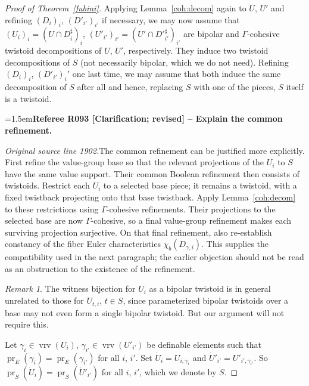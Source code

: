 \documentclass[12pt]{amsart}
\newcommand{\RefereeRemark}[4]{%
  \par\medskip\begingroup\normalfont\small\color{RefereePurple}%
  \emergencystretch=1.5em\noindent\textbf{Referee R#1 [#2] -- #3.}\par\nobreak\noindent #4\par
  \endgroup\medskip
}
\theoremstyle{plain}
\theoremstyle{definition}
\theoremstyle{remark}
\newtheorem{rem}[thm]{Remark}
\numberwithin{equation}{section}
\theoremstyle{plain}
\DeclareMathOperator{\pr}{pr}
\DeclareMathOperator{\K}{\mathds{k}}
\newcommand{\0}{\emptyset}
\DeclareMathOperator{\vrv}{vrv}
\DeclareMathOperator{\tbk}{tbk}
\begin{document}
\begin{proof}[Proof of Theorem~\ref{fubini}]
Applying Lemma~\ref{coh:decom} again to $U$, $U'$ and refining $(D_{i})_i$, $(D'_{i'})_{i'}$ if necessary, we may now assume that $(U_i)_i = (U \cap D^\sharp_i)_i$, $(U'_{i'})_{i'} = (U' \cap {D'}^\sharp_{i'})_{i'}$ are bipolar and $\Gamma$-cohesive twistoid decompositions of $U$, $U'$, respectively. They induce two twistoid decompositions of $S$ (not necessarily bipolar, which we do not need). Refining $(D_{i})_i$, $(D'_{i'})_i'$ one last time, we may assume that both induce the same decomposition of $S$ after all and hence, replacing $S$ with one of the pieces,  $S$ itself is a twistoid.

\RefereeRemark{093}{Clarification; revised}{Explain the common refinement}{%
\textit{Original source line 1902.}\quad The common refinement can be justified more explicitly. First refine the value-group base so that the relevant projections of the $U_i$ to $S$ have the same value support. Their common Boolean refinement then consists of twistoids. Restrict each $U_i$ to a selected base piece; it remains a twistoid, with a fixed twistback projecting onto that base twistback. Apply Lemma~\ref{coh:decom} to these restrictions using $\Gamma$-cohesive refinements. Their projections to the selected base are now $\Gamma$-cohesive, so a final value-group refinement makes each surviving projection surjective. On that final refinement, also re-establish constancy of the fiber Euler characteristics $\chi_b(D_{\gamma,i})$. This supplies the compatibility used in the next paragraph; the earlier objection should not be read as an obstruction to the existence of the refinement.
}

\begin{rem}
The witness bijection for $U_i$ as a bipolar twistoid is in general unrelated to those for $U_{t, i}$, $t \in S$, since parameterized bipolar twistoids over a base may not even form a single  bipolar twistoid. But our argument will not require this.
\end{rem}

Let $\gamma_i \in \vrv(U_i)$, $\gamma_{i'} \in \vrv(U'_{i'})$ be definable elements such that $\pr_E(\gamma_{i}) = \pr_E(\gamma_{i'})$ for all $i$, $i'$. Set $\dot U_i = U_{i, \gamma_i}$ and $\dot U'_{i'} = U'_{i', \gamma_{i'}}$. So $\pr_S(\dot U_{i}) = \pr_S(\dot U'_{i'})$ for all $i$, $i'$, which we denote by $\dot S$.



\end{proof}
\end{document}
